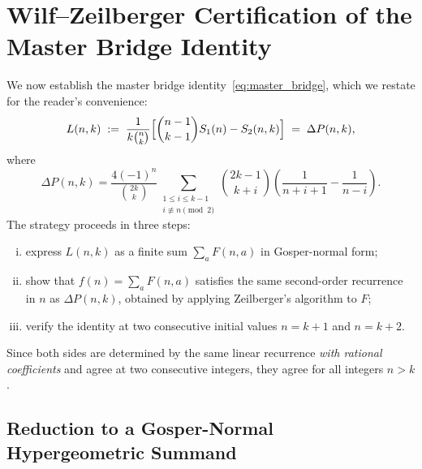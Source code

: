 %

\section{Wilf–Zeilberger Certification of the Master Bridge Identity}
\label{sec:WZ_proof}

We now establish the master bridge identity~\eqref{eq:master_bridge}, which
we restate for the reader's convenience:
\begin{equation}\label{eq:master_restate}
  L(n,k)
  \;:=\;
  \frac{1}{k\binom{n}{k}}
  \Bigl[\binom{n-1}{k-1}S_1(n) - S_2(n,k)\Bigr]
  \;=\;
  \Delta P(n,k),
\end{equation}
where
\begin{equation}
  \Delta P(n,k)
  = \frac{4(-1)^n}{\binom{2k}{k}}
    \sum_{\substack{1\le i\le k-1\\[1pt]i\not\equiv n\pmod{2}}}
    \binom{2k-1}{k+i}\!\left(\frac{1}{n+i+1}-\frac{1}{n-i}\right).
\end{equation}
The strategy proceeds in three steps:
\begin{enumerate}[(i)]
\item express $L(n,k)$ as a finite sum $\sum_{a}\! F(n,a)$ in Gosper-normal
      form;
\item show that $f(n)=\sum_{a}F(n,a)$ satisfies the same second-order
      recurrence in $n$ as $\Delta P(n,k)$, obtained by applying Zeilberger's
      algorithm to $F$;
\item verify the identity at two consecutive initial values $n=k+1$ and
      $n=k+2$.
\end{enumerate}
Since both sides are determined by the same linear recurrence \emph{with
rational coefficients} and agree at two consecutive integers, they agree for
all integers $n>k$.

\subsection{Reduction to a Gosper-Normal Hypergeometric Summand}

